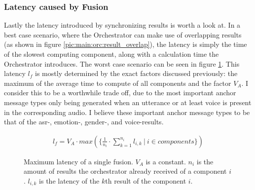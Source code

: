 \subsubsection{Latency caused by Fusion}
Lastly the latency introduced by synchronizing results is worth a look at.
In a best case scenario, where the Orchestrator can make use of overlapping results (as shown in figure \ref{pic:main:orc:result_overlap}), the latency is simply the time of the slowest computing component, along with a calculation time the Orchestrator introduces.
The worst case scenario can be seen in figure \ref{main:orc:latency:formula}.
This latency $l_f$ is mostly determined by the exact factors discussed previously: the maximum of the average time to compute of all components and the factor $V_A$. 
I consider this to be a worthwhile trade off, due to the most important anchor message types only being generated when an utterance or at least voice is present in the corresponding audio.
I believe these important anchor message types to be that of the \gls{asr}-, emotion-, gender-, and voice-results.

\begin{figure}
	\begin{align*}
	l_{f} = V_A \cdot max(\{\frac{1}{n_i} \cdot \sum_{k=1}^{n_i} l_{i,k}\ | \ i \in components\})
	\end{align*}
	\caption{Maximum latency of a single fusion.
		$V_A$ is a constant.
		$n_i$ is the amount of results the orchestrator already received of a component $i$.
		$l_{i,k}$ is the latency of the $k$th result of the component $i$.}
	\label{main:orc:latency:formula}
\end{figure}
